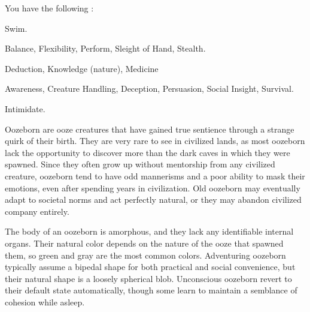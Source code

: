       You have the following :
      \begin{raggeditemize}
        \item {} Swim.
        \item {} Balance, Flexibility, Perform, Sleight of Hand, Stealth.
        \item {} Deduction, Knowledge (nature), Medicine
        \item {} Awareness, Creature Handling, Deception, Persuasion, Social Insight, Survival.
        \item {} Intimidate.
      \end{raggeditemize}

  Oozeborn are ooze creatures that have gained true sentience through a strange quirk of their birth.
  They are very rare to see in civilized lands, as most oozeborn lack the opportunity to discover more than the dark caves in which they were spawned.
  Since they often grow up without mentorship from any civilized creature, oozeborn tend to have odd mannerisms and a poor ability to mask their emotions, even after spending years in civilization.
  Old oozeborn may eventually adapt to societal norms and act perfectly natural, or they may abandon civilized company entirely.

  The body of an oozeborn is amorphous, and they lack any identifiable internal organs.
  Their natural color depends on the nature of the ooze that spawned them, so green and gray are the most common colors.
  Adventuring oozeborn typically assume a bipedal shape for both practical and social convenience, but their natural shape is a loosely spherical blob.
  Unconscious oozeborn revert to their default state automatically, though some learn to maintain a semblance of cohesion while asleep.

